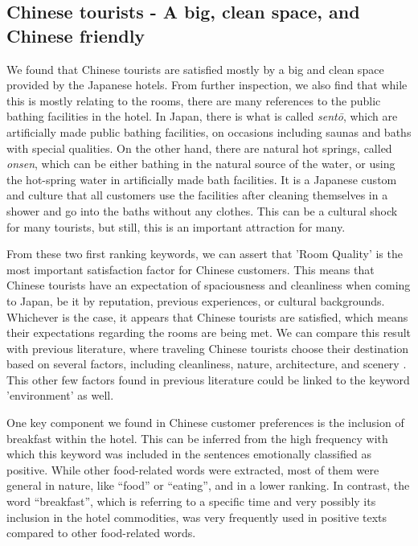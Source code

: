 \subsection{Chinese tourists - A big, clean space, and Chinese friendly}\label{disc:zh}

We found that Chinese tourists are satisfied mostly by a big and clean space provided by the Japanese hotels. From further inspection, we also find that while this is mostly relating to the rooms, there are many references to the public bathing facilities in the hotel. In Japan, there is what is called \textit{sent\=o}, which are artificially made public bathing facilities, on occasions including saunas and baths with special qualities. On the other hand, there are natural hot springs, called \textit{onsen}, which can be either bathing in the natural source of the water, or using the hot-spring water in artificially made bath facilities. It is a Japanese custom and culture that all customers use the facilities after cleaning themselves in a shower and go into the baths without any clothes. This can be a cultural shock for many tourists, but still, this is an important attraction for many.

From these two first ranking keywords, we can assert that 'Room Quality' is the most important satisfaction factor for Chinese customers. This means that Chinese tourists have an expectation of spaciousness and cleanliness when coming to Japan, be it by reputation, previous experiences, or cultural backgrounds. Whichever is the case, it appears that Chinese tourists are satisfied, which means their expectations regarding the rooms are being met. We can compare this result with previous literature, where traveling Chinese tourists choose their destination based on several factors, including cleanliness, nature, architecture, and scenery \cite[][]{ryan2001}. This other few factors found in previous literature could be linked to the keyword 'environment' as well.

One key component we found in Chinese customer preferences is the inclusion of breakfast within the hotel. This can be inferred from the high frequency with which this keyword was included in the sentences emotionally classified as positive. While other food-related words were extracted, most of them were general in nature, like “food” or “eating”, and in a lower ranking. In contrast, the word “breakfast”, which is referring to a specific time and very possibly its inclusion in the hotel commodities, was very frequently used in positive texts compared to other food-related words. 

